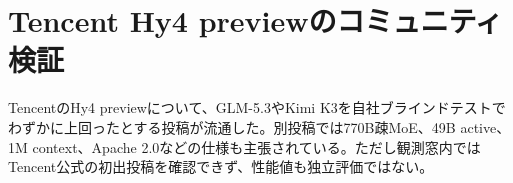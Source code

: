\section{Tencent Hy4 previewのコミュニティ検証}
TencentのHy4 previewについて、GLM-5.3やKimi K3を自社ブラインドテストでわずかに上回ったとする投稿が流通した。別投稿では770B疎MoE、49B active、1M context、Apache 2.0などの仕様も主張されている。ただし観測窓内ではTencent公式の初出投稿を確認できず、性能値も独立評価ではない。
